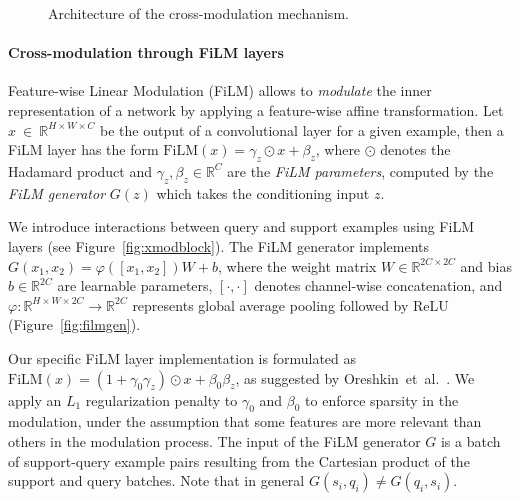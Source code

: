 \documentclass{article}
\begin{document}
\begin{figure}[t]
  \centering
  \qquad
  \qquad
  \qquad
  \caption{Architecture of the cross-modulation mechanism.}
  \label{fig:pairwise_mod}
\end{figure}


\paragraph{Cross-modulation through FiLM layers}
Feature-wise Linear Modulation (FiLM) \cite{perez2017film} allows to
\emph{modulate} the inner representation of a network by
applying a feature-wise affine transformation. Let
$x~\in~\mathbb{R}^{H \times W \times C}$ be the output of a
convolutional layer for a given example, then a FiLM layer has the
form $\mathrm{FiLM}(x) = \gamma_z \odot x + \beta_z$, where $\odot$ denotes
the Hadamard product and $\gamma_z,\beta_z \in \mathbb{R}^C$ are the
\emph{FiLM parameters}, computed by the \emph{FiLM generator} $G(z)$
which takes the conditioning input $z$.

We introduce interactions between
query and support examples using FiLM layers (see
Figure~\ref{fig:xmodblock}). The FiLM generator implements
$G(x_1, x_2) = \varphi\left([x_1, x_2]\right) W + b$, where the weight matrix
$W \in \mathbb{R}^{2C \times 2C}$ and bias
$b \in \mathbb{R}^{2C}$ are learnable parameters,
$[\cdot, \cdot]$ denotes channel-wise concatenation, and
$\varphi: \mathbb{R}^{H \times W \times 2C} \to \mathbb{R}^{2C}$ represents
global average pooling followed by ReLU (Figure~\ref{fig:filmgen}).

Our specific FiLM layer implementation is formulated as
$\mathrm{FiLM}(x) = (1 + \gamma_0\gamma_z) \odot x + \beta_0\beta_z$,
as suggested by Oreshkin~et~al.~\cite{oreshkin18tadam}. We apply an $L_1$
regularization penalty to $\gamma_0$ and $\beta_0$ to enforce sparsity in
the modulation, under the assumption that some features are more relevant
than others in the modulation process. The input of the FiLM generator
$G$ is a batch of support-query example pairs resulting from the Cartesian
product of the support and query batches. Note that in general
$G(s_i, q_i) \neq G(q_i, s_i)$.
\end{document}
